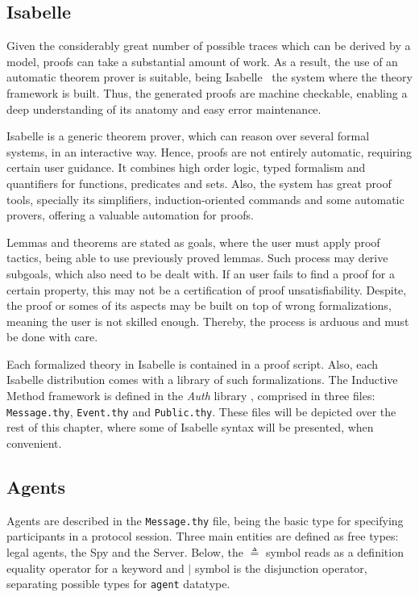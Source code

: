 \subsection{Isabelle}
Given the considerably great number of possible traces which can be derived by a model, proofs can take a substantial amount of work. As a result, the use of an automatic theorem prover is suitable, being Isabelle~\cite{isabelle} the system where the theory framework is built. Thus, the generated proofs are machine checkable, enabling a deep understanding of its anatomy and easy error maintenance.

Isabelle is a generic theorem prover, which can reason over several formal systems, in an interactive way. Hence, proofs are not entirely automatic, requiring certain user guidance. It combines high order logic, typed formalism and quantifiers for functions, predicates and sets. Also, the system has great proof tools, specially its simplifiers, induction-oriented commands and some automatic provers, offering a valuable automation for proofs.

Lemmas and theorems are stated as goals, where the user must apply proof tactics, being able to use previously proved lemmas. Such process may derive subgoals, which also need to be dealt with. If an user fails to find a proof for a certain property, this may not be a certification of proof unsatisfiability. Despite, the proof or somes of its aspects may be built on top of wrong formalizations, meaning the user is not skilled enough. Thereby, the process is arduous and must be done with care.

Each formalized theory in Isabelle is contained in a proof script. Also, each Isabelle distribution comes with a library of such formalizations. The Inductive Method framework is defined in the \textit{Auth} library \cite{isabelle-hol-auth}, comprised in three files: \texttt{Message.thy}, \texttt{Event.thy} and \texttt{Public.thy}. These files will be depicted over the rest of this chapter, where some of Isabelle syntax will be presented, when convenient.



\subsection{Agents}
Agents are described in the \texttt{Message.thy} file, being the basic type for specifying participants in a protocol session. Three main entities are defined as free types: legal agents, the Spy and the Server. Below, the $\triangleq$ symbol reads as a definition equality operator for a keyword and $|$ symbol is the disjunction operator, separating possible types for \texttt{agent} datatype.

